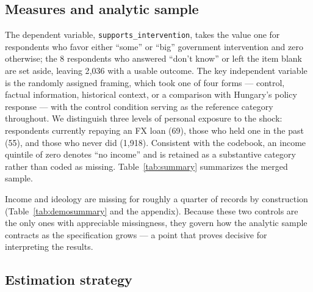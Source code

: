 \documentclass[11pt]{article}
\begin{document}
\subsection{Measures and analytic sample}

The dependent variable, \texttt{supports\_intervention}, takes the value one for
respondents who favor either ``some'' or ``big'' government intervention and zero
otherwise; the 8 respondents who answered ``don't know'' or left the item blank
are set aside, leaving 2{,}036 with a usable outcome. The key independent
variable is the randomly assigned framing, which took one of four forms ---
control, factual information, historical context, or a comparison with Hungary's
policy response --- with the control condition serving as the reference category
throughout. We distinguish three levels of personal exposure to the shock:
respondents currently repaying an FX loan (69), those who held one in the past
(55), and those who never did (1{,}918). Consistent with the codebook, an income
quintile of zero denotes ``no income'' and is retained as a substantive category
rather than coded as missing. Table~\ref{tab:summary} summarizes the merged
sample.

\begin{table}[H]
\centering
\caption{Summary statistics, merged analytic sample.}
\label{tab:summary}

\end{table}

Income and ideology are missing for roughly a quarter of records by construction
(Table~\ref{tab:demosummary} and the appendix). Because these two controls are
the only ones with appreciable missingness, they govern how the analytic sample
contracts as the specification grows --- a point that proves decisive for
interpreting the results.

\subsection{Estimation strategy}
\end{document}
